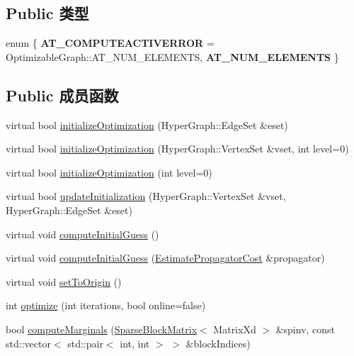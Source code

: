 \subsection*{Public 类型}
\begin{DoxyCompactItemize}
\item 
enum \{ {\bfseries A\-T\-\_\-\-C\-O\-M\-P\-U\-T\-E\-A\-C\-T\-I\-V\-E\-R\-R\-O\-R} = Optimizable\-Graph\-:\-:A\-T\-\_\-\-N\-U\-M\-\_\-\-E\-L\-E\-M\-E\-N\-T\-S, 
{\bfseries A\-T\-\_\-\-N\-U\-M\-\_\-\-E\-L\-E\-M\-E\-N\-T\-S}
 \}
\end{DoxyCompactItemize}
\subsection*{Public 成员函数}
\begin{DoxyCompactItemize}
\item 
virtual bool \hyperlink{classg2o_1_1SparseOptimizer_a56c0c13954ac7204cfb031c141ece9ae}{initialize\-Optimization} (Hyper\-Graph\-::\-Edge\-Set \&eset)
\item 
virtual bool \hyperlink{classg2o_1_1SparseOptimizer_ab16dd36e32577ba5856239ce721ec70b}{initialize\-Optimization} (Hyper\-Graph\-::\-Vertex\-Set \&vset, int level=0)
\item 
virtual bool \hyperlink{classg2o_1_1SparseOptimizer_ace3994bf5f403c7fa0305635aa598473}{initialize\-Optimization} (int level=0)
\item 
virtual bool \hyperlink{classg2o_1_1SparseOptimizer_ae971d068585055973798f93ac2363d94}{update\-Initialization} (Hyper\-Graph\-::\-Vertex\-Set \&vset, Hyper\-Graph\-::\-Edge\-Set \&eset)
\item 
virtual void \hyperlink{classg2o_1_1SparseOptimizer_a59db9f16934d3b9f7a52511f0be1bb07}{compute\-Initial\-Guess} ()
\item 
virtual void \hyperlink{classg2o_1_1SparseOptimizer_a2fba11c8572fce4a8c1bcca4fa3e43fb}{compute\-Initial\-Guess} (\hyperlink{classg2o_1_1EstimatePropagatorCost}{Estimate\-Propagator\-Cost} \&propagator)
\item 
virtual void \hyperlink{classg2o_1_1SparseOptimizer_ab8af902464774ec3d3910a3674791714}{set\-To\-Origin} ()
\item 
int \hyperlink{classg2o_1_1SparseOptimizer_a098257ee6f13dbb79be07075244d9930}{optimize} (int iterations, bool online=false)
\item 
bool \hyperlink{classg2o_1_1SparseOptimizer_a656be8b8244a48dc1207f29eec77af5a}{compute\-Marginals} (\hyperlink{classg2o_1_1SparseBlockMatrix}{Sparse\-Block\-Matrix}$<$ Matrix\-Xd $>$ \&spinv, const std\-::vector$<$ std\-::pair$<$ int, int $>$ $>$ \&block\-Indices)

\end{DoxyCompactItemize}
